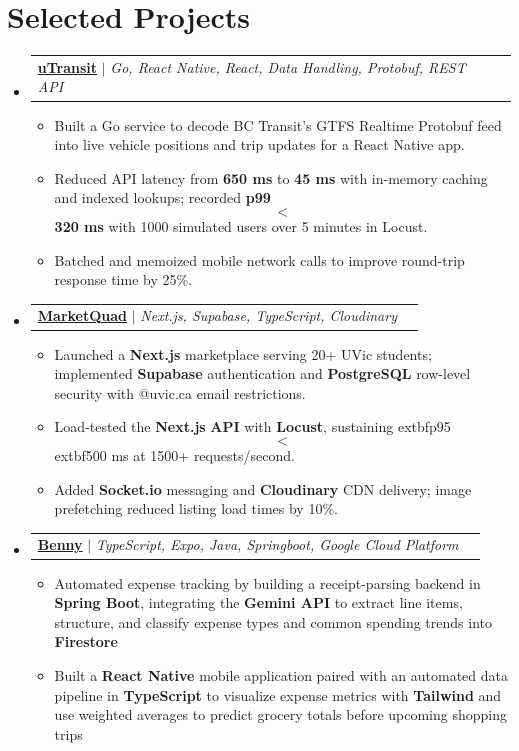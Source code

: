 \documentclass[letterpaper,10pt]{article}
\makeatletter
\newcommand{\resumeItem}[1]{
  \item\small{
    {#1 \vspace{-1pt}}
  }
}
\newcommand{\resumeProjectHeading}[2]{
    \item
    \begin{tabularx}{0.97\textwidth}{@{}Xr@{}}
      \small#1 & #2 \\
    \end{tabularx}\vspace{-6pt}
}
\newcommand{\resumeSubHeadingListStart}{\begin{itemize}[leftmargin=0.15in, label={}]}
\newcommand{\resumeSubHeadingListEnd}{\end{itemize}}
\newcommand{\resumeItemListStart}{\begin{itemize}[label=$\bullet$, itemsep=1.80pt, topsep=0pt, parsep=0pt]}
\newcommand{\resumeItemListEnd}{\end{itemize}\vspace{-2pt}}
\makeatother
\begin{document}
\section{Selected Projects}
\resumeSubHeadingListStart
\resumeProjectHeading{\href{https://github.com/samnne/utransit}{\textbf{uTransit}} $|$ \emph{Go, React Native, React, Data Handling, Protobuf, REST API}}{}
\resumeItemListStart
  \resumeItem{Built a Go service to decode BC Transit's GTFS Realtime Protobuf feed into live vehicle positions and trip updates for a React Native app.}
  \resumeItem{Reduced API latency from \textbf{650 ms} to \textbf{45 ms} with in-memory caching and indexed lookups; recorded \textbf{p99} $$<$$ \textbf{320 ms} with 1000 simulated users over 5 minutes in Locust.}
  \resumeItem{Batched and memoized mobile network calls to improve round-trip response time by 25\%.}
\resumeItemListEnd
\resumeProjectHeading{\href{https://github.com/samnne/marketquad}{\textbf{MarketQuad}} $|$ \emph{Next.js, Supabase, TypeScript, Cloudinary}}{}
\resumeItemListStart
  \resumeItem{Launched a \textbf{Next.js} marketplace serving 20+ UVic students; implemented \textbf{Supabase} authentication and \textbf{PostgreSQL} row-level security with @uvic.ca email restrictions.}
  \resumeItem{Load-tested the \textbf{Next.js} \textbf{API} with \textbf{Locust}, sustaining 	extbf{p95} $$<$$ 	extbf{500 ms} at 1500+ requests/second.}
  \resumeItem{Added \textbf{Socket.io} messaging and \textbf{Cloudinary} CDN delivery; image prefetching reduced listing load times by 10\%.}
\resumeItemListEnd
\resumeProjectHeading{\href{https://github.com/samnne/benny}{\textbf{Benny}} $|$ \emph{TypeScript, Expo, Java, Springboot, Google Cloud Platform}}{}
\resumeItemListStart
  \resumeItem{Automated expense tracking by building a receipt-parsing backend in \textbf{Spring Boot}, integrating the \textbf{Gemini API} to extract line items, structure, and classify expense types and common spending trends into \textbf{Firestore}}
  \resumeItem{Built a \textbf{React Native} mobile application paired with an automated data pipeline in \textbf{TypeScript} to visualize expense metrics with \textbf{Tailwind} and use weighted averages to predict grocery totals before upcoming shopping trips}
\resumeItemListEnd
\resumeSubHeadingListEnd
\end{document}
